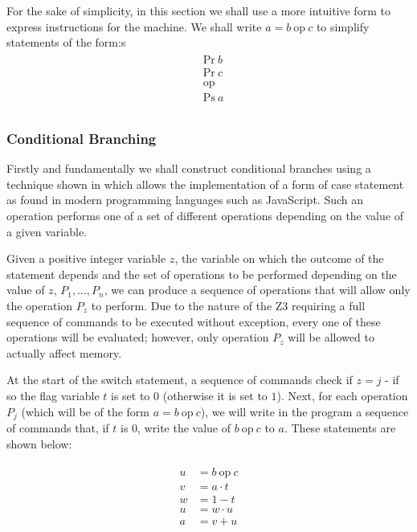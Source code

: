 \documentclass[Master.tex]{subfiles}
\begin{document}
For the sake of simplicity, in this section we shall use a more intuitive form to express instructions for the machine. We shall write $a = b\ \mathrm{op}\ c$ to simplify statements of the form:s
\begin{gather*}
\begin{aligned}
&\mathrm{Pr}\ b\\
&\mathrm{Pr}\ c\\
&\textrm{op}\\ 
&\mathrm{Ps}\ a\\
\end{aligned}
\end{gather*}

\subsubsection{Conditional Branching}

Firstly and fundamentally we shall construct conditional branches using a technique shown in \cite{ibarra1983control} which allows the implementation of a form of case statement as found in modern programming languages such as JavaScript. Such an operation performs one of a set of different operations depending on the value of a given variable.

Given a positive integer variable $z$, the variable on which the outcome of the statement depends and the set of operations to be performed depending on the value of $z$, $P_1, ... , P_n$, we can produce a sequence of operations that will allow only the operation $P_z$ to perform. Due to the nature of the Z3 requiring a full sequence of commands to be executed without exception, every one of these operations will be evaluated; however, only operation $P_z$ will be allowed to actually affect memory.


At the start of the switch statement, a sequence of commands check if $z = j$ - if so the flag variable $t$ is set to $0$ (otherwise it is set to $1$). Next, for each operation $P_j$ (which will be of the form $a = b\ \mathrm{op}\ c$), we will write in the program a sequence of commands that, if $t$ is $0$, write the value of $b\ \mathrm{op}\ c$ to $a$. These statements are shown below:

\begin{gather*}
\begin{aligned}
u &= b\ \mathrm{op}\ c \\
v &= a \cdot t \\
w &= 1 - t \\
u &= w \cdot u \\
a &= v + u
\end{aligned}
\end{gather*}
\end{document}
